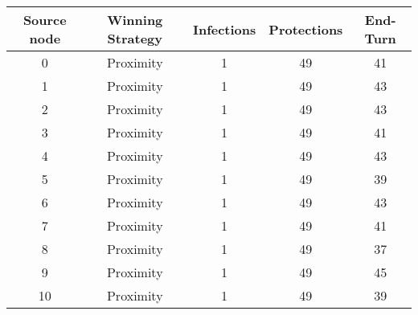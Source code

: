 \documentclass[results.tex]{subfiles}
\begin{document}
    \begin{center}
        \begin{tabular}{| c || c | c | c | c |}
            \hline
            {\bfseries Source node} & {\bfseries Winning Strategy} & {\bfseries Infections} & {\bfseries Protections}
            & {\bfseries End-Turn}
            \\  %
            \hline\hline
            0                       & Proximity                    & 1                      & 49                      & 41                   \\
            \hline
            1                       & Proximity                    & 1                      & 49                      & 43                   \\
            \hline
            2                       & Proximity                    & 1                      & 49                      & 43                   \\
            \hline
            3                       & Proximity                    & 1                      & 49                      & 41                   \\
            \hline
            4                       & Proximity                    & 1                      & 49                      & 43                   \\
            \hline
            5                       & Proximity                    & 1                      & 49                      & 39                   \\
            \hline
            6                       & Proximity                    & 1                      & 49                      & 43                   \\
            \hline
            7                       & Proximity                    & 1                      & 49                      & 41                   \\
            \hline
            8                       & Proximity                    & 1                      & 49                      & 37                   \\
            \hline
            9                       & Proximity                    & 1                      & 49                      & 45                   \\
            \hline
            10                      & Proximity                    & 1                      & 49                      & 39                   \\

\end{tabular}
\end{center}
\end{document}

